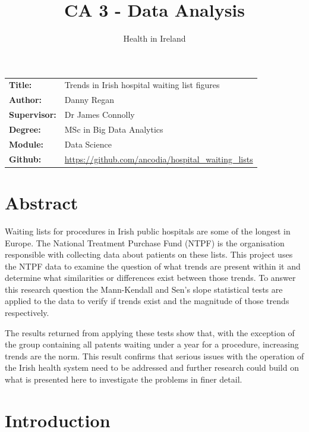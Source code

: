 \documentclass[
  12pt,
]{article}
\title{CA 3 - Data Analysis}
\subtitle{Health in Ireland}
\author{}
\date{\vspace{-2.5em}}
\begin{document}
\maketitle

\setcounter{page}{1}
\renewcommand{\arraystretch}{1.5}
\renewcommand{\footnotesize}{\small \justify}

\begingroup
\setlength{\tabcolsep}{15pt} 
\renewcommand{\arraystretch}{1.5} 
  \begin{tabular}[]{@{}ll@{}}
    \bf Title:      & Trends in Irish hospital waiting list figures \\
    \bf Author:     & Danny Regan \\
    \bf Supervisor: & Dr James Connolly \\
    \bf Degree:     & MSc in Big Data Analytics \\
    \bf Module:     & Data Science \\
    \bf Github:     & \url{https://github.com/ancodia/hospital_waiting_lists}
  \end{tabular}
\endgroup

\hypertarget{abstract}{%
\section{Abstract}\label{abstract}}

Waiting lists for procedures in Irish public hospitals are some of the longest in Europe. The National Treatment Purchase Fund (NTPF) is the organisation responsible with collecting data about patients on these lists. This project uses the NTPF data to examine the question of what trends are present within it and determine what similarities or differences exist between those trends. To answer this research question the Mann-Kendall and Sen's slope statistical tests are applied to the data to verify if trends exist and the magnitude of those trends respectively.

The results returned from applying these tests show that, with the exception of the group containing all patents waiting under a year for a procedure, increasing trends are the norm. This result confirms that serious issues with the operation of the Irish health system need to be addressed and further research could build on what is presented here to investigate the problems in finer detail.

\newpage

\hypertarget{introduction}{%
\section{Introduction}\label{introduction}}
\end{document}
